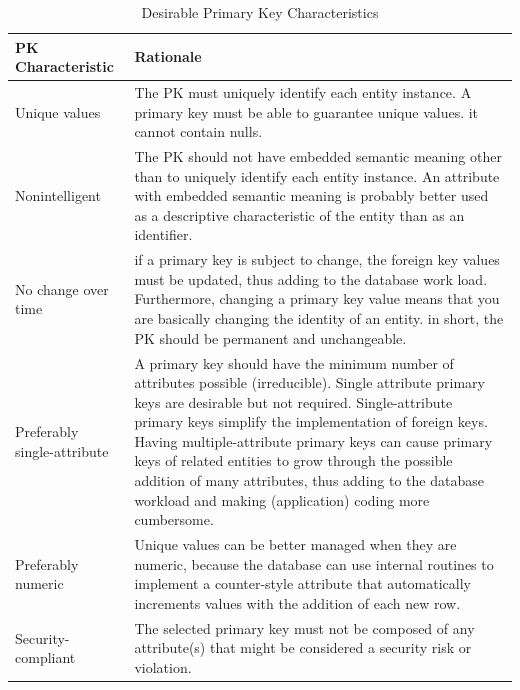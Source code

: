 \documentclass[a4paper, 12pt, titlepage]{report}
\begin{document}
{\begin{center}
\begin{longtable}{ p{5cm} p{9cm} }
\caption{Desirable Primary Key Characteristics\label{long}}\\
\toprule
\toprule
PK Characteristic & Rationale\\ 
\midrule
Unique values & The PK must uniquely identify each entity instance. A primary key must be able to guarantee unique values. it cannot contain nulls.\\
\midrule
Nonintelligent & The PK should not have embedded semantic meaning other than to uniquely identify each entity instance. An attribute with embedded semantic meaning is probably better used as a descriptive characteristic of the entity than as an identifier. \\
\midrule
No change over time & if a primary key is subject to change, the foreign key values must be updated, thus adding to the database work load. Furthermore, changing a primary key value means that you are basically changing the identity of an entity. in short, the PK should be permanent and unchangeable.\\
\midrule
Preferably single-attribute & A primary key should have the minimum number of attributes possible (irreducible). Single attribute primary keys are desirable but not required. Single-attribute primary keys simplify the implementation of foreign keys. Having multiple-attribute primary keys can cause primary keys of related entities to grow through the possible addition of many attributes, thus adding to the database workload and making (application) coding more cumbersome.\\
\midrule
Preferably numeric & Unique values can be better managed when they are numeric, because the database can use internal routines to implement a counter-style attribute that automatically increments values with the addition of each new row. \\
\midrule
Security-compliant & The selected primary key must not be composed of any attribute(s) that might be considered a security risk or violation.\\
\bottomrule
\bottomrule
\end{longtable}
\end{center}
}
\end{document}
